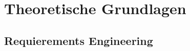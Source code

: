 \documentclass[../Bachelorarbeit.tex]{subfiles}
\begin{document}
\section{Theoretische Grundlagen}
\blindtext[1]

\subsection{Requierements Engineering}
\blindtext[1]
\end{document}
